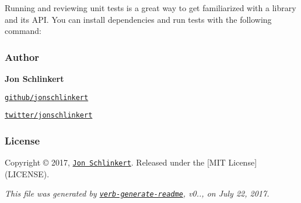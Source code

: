 Running and reviewing unit tests is a great way to get familiarized with a library and its A\+PI. You can install dependencies and run tests with the following command\+:




\subsubsection*{Author}

{\bfseries Jon Schlinkert}


\begin{DoxyItemize}
\item \href{https://github.com/jonschlinkert}{\tt github/jonschlinkert}
\item \href{https://twitter.com/jonschlinkert}{\tt twitter/jonschlinkert}
\end{DoxyItemize}

\subsubsection*{License}

Copyright © 2017, \href{https://github.com/jonschlinkert}{\tt Jon Schlinkert}. Released under the \mbox{[}M\+IT License\mbox{]}(L\+I\+C\+E\+N\+SE).





{\itshape This file was generated by \href{https://github.com/verbose/verb-generate-readme}{\tt verb-\/generate-\/readme}, v0.., on July 22, 2017.} 